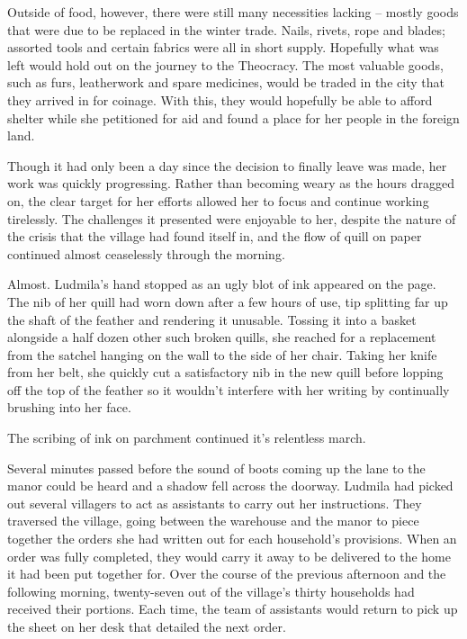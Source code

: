  

Outside of food, however, there were still many necessities lacking – mostly goods that were due to be replaced in the winter trade. Nails, rivets, rope and blades; assorted tools and certain fabrics were all in short supply. Hopefully what was left would hold out on the journey to the Theocracy. The most valuable goods, such as furs, leatherwork and spare medicines, would be traded in the city that they arrived in for coinage. With this, they would hopefully be able to afford shelter while she petitioned for aid and found a place for her people in the foreign land.

 

Though it had only been a day since the decision to finally leave was made, her work was quickly progressing. Rather than becoming weary as the hours dragged on, the clear target for her efforts allowed her to focus and continue working tirelessly. The challenges it presented were enjoyable to her, despite the nature of the crisis that the village had found itself in, and the flow of quill on paper continued almost ceaselessly through the morning.

 

Almost. Ludmila’s hand stopped as an ugly blot of ink appeared on the page. The nib of her quill had worn down after a few hours of use, tip splitting far up the shaft of the feather and rendering it unusable. Tossing it into a basket alongside a half dozen other such broken quills, she reached for a replacement from the satchel hanging on the wall to the side of her chair. Taking her knife from her belt, she quickly cut a satisfactory nib in the new quill before lopping off the top of the feather so it wouldn’t interfere with her writing by continually brushing into her face.

 

The scribing of ink on parchment continued it’s relentless march.

 

Several minutes passed before the sound of boots coming up the lane to the manor could be heard and a shadow fell across the doorway. Ludmila had picked out several villagers to act as assistants to carry out her instructions. They traversed the village, going between the warehouse and the manor to piece together the orders she had written out for each household’s provisions. When an order was fully completed, they would carry it away to be delivered to the home it had been put together for. Over the course of the previous afternoon and the following morning, twenty-seven out of the village’s thirty households had received their portions. Each time, the team of assistants would return to pick up the sheet on her desk that detailed the next order.

